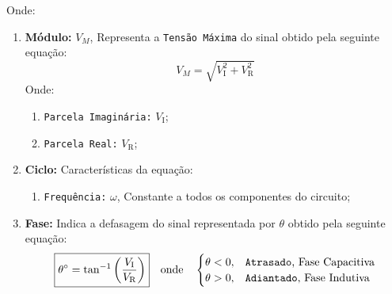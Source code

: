 \documentclass{article}
\begin{document}
            Onde:
                \begin{enumerate}
                    \item \textbf{Módulo:} $V_{M}$, Representa a \texttt{Tensão Máxima} do sinal obtido pela seguinte equação:
                        \begin{equation*}
                            \boxed{
                                V_{M} = \sqrt{
                                    V_{\text{I}}^{2} + V_{\text{R}}^{2}
                                }
                            }
                        \end{equation*}
                    Onde:
                        \begin{enumerate}[noitemsep, rightmargin = \leftmargin]
                            \item \texttt{Parcela Imaginária:} $V_{\text{I}}$;

                            \item \texttt{Parcela Real:} $V_{\text{R}}$;
                        \end{enumerate}


                    \item \textbf{Ciclo:} Características da equação:
                        \begin{enumerate}[noitemsep, rightmargin = \leftmargin]
                            \item \texttt{Frequência:} $\omega$, Constante a todos os componentes do circuito;
                        \end{enumerate}

                    \item \textbf{Fase:} Indica a defasagem do sinal representada por $\theta$ obtido pela seguinte equação:
                        \begin{equation*}
                            \boxed{
                                \theta^{\circ} = \tan^{-1}
                                \left(
                                    \frac{V_{\text{I}}}{V_{\text{R}}}
                                \right)
                            }
                            \quad
                            \text{onde}
                            \quad
                            \begin{cases}
                                \theta < 0, & \text{\texttt{Atrasado}, Fase Capacitiva}\\
                                \theta > 0, & \text{\texttt{Adiantado}, Fase Indutiva}
                            \end{cases}
                        \end{equation*}
                \end{enumerate}
\end{document}
